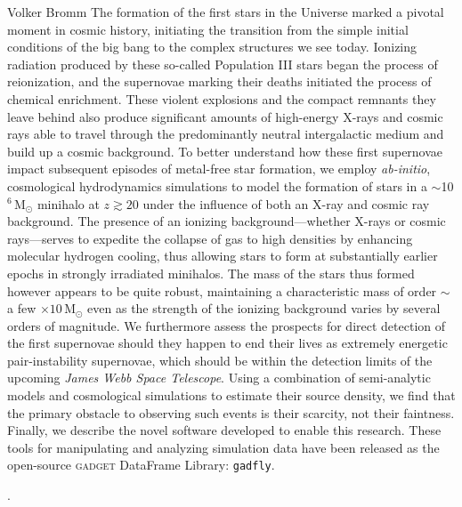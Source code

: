 \documentclass[12pt,double]{thesis}
\newcommand{\msun}{\ensuremath{\,\mathrm{M}_{\odot}}\xspace}
\begin{document}
\begin{UTabstract}{Volker Bromm}
The formation of the first stars in the Universe marked a pivotal moment in cosmic history, initiating the transition from the simple initial conditions of the big bang to the complex structures we see today.
Ionizing radiation produced by these so-called Population III stars began the process of reionization, and the supernovae marking their deaths initiated the process of chemical enrichment. 
These violent explosions and the compact remnants they leave behind also produce significant amounts of high-energy X-rays and cosmic rays able  to travel through the predominantly neutral intergalactic medium and build up a cosmic background.
To better understand how these first supernovae impact subsequent episodes of metal-free star formation, we employ \textit{ab-initio}, cosmological hydrodynamics simulations to model the formation of stars in a $\sim$10$^6\msun$ minihalo at $z \gtrsim 20$ under the influence of both an X-ray and cosmic ray background.
The presence of an ionizing background---whether X-rays or cosmic rays---serves to expedite the collapse of gas to high densities by enhancing molecular hydrogen cooling, thus allowing stars to form at substantially earlier epochs in strongly irradiated minihalos.
The mass of the stars thus formed however appears to be quite robust, maintaining a characteristic mass of order $\sim$ a few $\times10\msun$ even as the strength of the ionizing background varies by several orders of magnitude.
We furthermore assess the prospects for direct detection of the first supernovae should they happen to end their lives as extremely energetic pair-instability supernovae, which should be within the detection limits of the upcoming \textit{James Webb Space Telescope}.
Using a combination of semi-analytic models and cosmological simulations to estimate their source density, we find that the primary obstacle to observing such events is their scarcity, not their faintness.
Finally, we describe the novel software developed to enable this research.  These tools for manipulating and analyzing simulation data have been released as the open-source \textsc{gadget} DataFrame Library: \verb|gadfly|.
\end{UTabstract}


\tableofcontents.

\listoftables
\listoffigures

\mainmatter









\backmatter

\printindex

\cleardoublepage
{}


\end{document}
